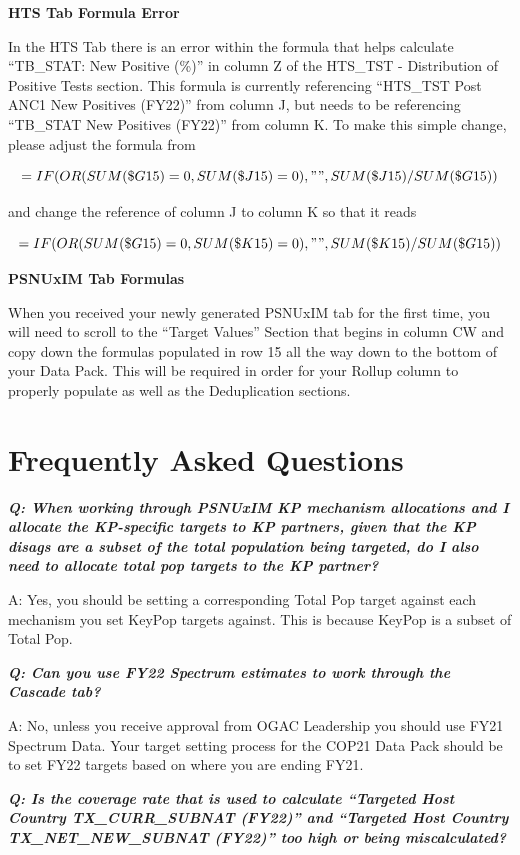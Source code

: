 \documentclass[
  openany]{book}
\begin{document}
\textbf{HTS Tab Formula Error}

In the HTS Tab there is an error within the formula that helps calculate ``TB\_STAT: New Positive (\%)'' in column Z of the HTS\_TST - Distribution of Positive Tests section. This formula is currently referencing ``HTS\_TST Post ANC1 New Positives (FY22)'' from column J, but needs to be referencing ``TB\_STAT New Positives (FY22)'' from column K. To make this simple change, please adjust the formula from

\[=IF(OR(SUM(\$G15)=0,SUM(\$J15)=0),"",SUM(\$J15)/SUM(\$G15))\]

and change the reference of column J to column K so that it reads

\[=IF(OR(SUM(\$G15)=0,SUM(\$K15)=0),"",SUM(\$K15)/SUM(\$G15))\]

\textbf{PSNUxIM Tab Formulas}

When you received your newly generated PSNUxIM tab for the first time, you will need to scroll to the ``Target Values'' Section that begins in column CW and copy down the formulas populated in row 15 all the way down to the bottom of your Data Pack. This will be required in order for your Rollup column to properly populate as well as the Deduplication sections.

\hypertarget{frequently-asked-questions}{%
\chapter{Frequently Asked Questions}\label{frequently-asked-questions}}

\textbf{\emph{Q: When working through PSNUxIM KP mechanism allocations and I allocate the KP-specific targets to KP partners, given that the KP disags are a subset of the total population being targeted, do I also need to allocate total pop targets to the KP partner?}}

A: Yes, you should be setting a corresponding Total Pop target against each mechanism you set KeyPop targets against. This is because KeyPop is a subset of Total Pop.

\textbf{\emph{Q: Can you use FY22 Spectrum estimates to work through the Cascade tab?}}

A: No, unless you receive approval from OGAC Leadership you should use FY21 Spectrum Data. Your target setting process for the COP21 Data Pack should be to set FY22 targets based on where you are ending FY21.

\textbf{\emph{Q: Is the coverage rate that is used to calculate ``Targeted Host Country TX\_CURR\_SUBNAT (FY22)'' and ``Targeted Host Country TX\_NET\_NEW\_SUBNAT (FY22)'' too high or being miscalculated?}}
\end{document}
